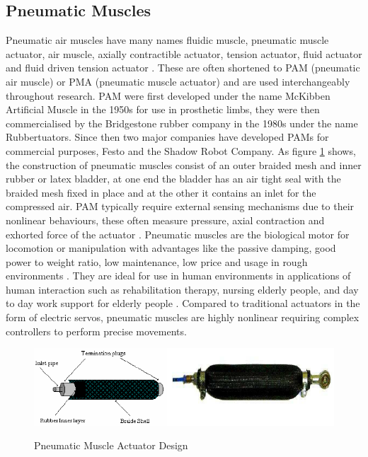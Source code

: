 \documentclass[11pt,a4paper]{article}
\begin{document}
\subsection{Pneumatic Muscles}
\label{sub:pneumatic_muscles}
Pneumatic air muscles have many names fluidic muscle, pneumatic muscle actuator, air muscle, axially contractible actuator, tension actuator, fluid actuator and fluid driven tension actuator \cite{najmuddin_mustaffa_2017} \cite{lau_chai_2012}. These are often shortened to PAM (pneumatic air muscle) or PMA (pneumatic muscle actuator) and are used interchangeably throughout research. PAM were first developed under the name McKibben Artificial Muscle in the 1950s for use in prosthetic limbs, they were then commercialised by the Bridgestone rubber company in the 1980s under the name Rubbertuators. Since then two major companies have developed PAMs for commercial purposes, Festo and the Shadow Robot Company. As figure \ref{fig:pneumatic_design} shows, the construction of pneumatic muscles consist of an outer braided mesh and inner rubber or latex bladder, at one end the bladder has an air tight seal with the braided mesh fixed in place and at the other it contains an inlet for the compressed air. PAM typically require external sensing mechanisms due to their nonlinear behaviours, these often measure pressure, axial contraction and exhorted force of the actuator \cite{erin_pol_valle_park_2016}. \newline
Pneumatic muscles are the biological motor for locomotion or manipulation with advantages like the passive damping, good power to weight ratio, low maintenance, low price and usage in rough environments \cite{ranjan_upadhyay_kumar_dhyani_2012}. They are ideal for use in human environments in applications of human interaction such as rehabilitation therapy, nursing elderly people, and day to day work support for elderly people \cite{saga_nagase_saikawa_2006}. Compared to traditional actuators in the form of electric servos, pneumatic muscles are highly nonlinear requiring complex controllers to perform precise movements. \newline

\begin{figure}[hbt!]
    \centering
    \caption{Pneumatic Muscle Actuator Design \cite{pneumatic_image}}
    \includegraphics[scale=0.6]{Pneumatic-Muscle-Actuator-Design.png}
    \label{fig:pneumatic_design}
\end{figure}
\end{document}

